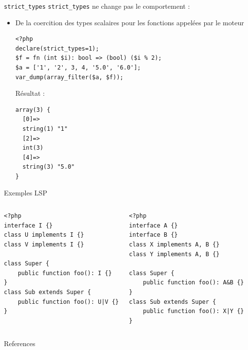 \documentclass[10pt]{beamer}
\begin{document}
\begin{frame}[fragile]{\texttt{strict\_types}}
    \texttt{strict\_types} ne change \alert{pas} le comportement :

    \begin{itemize}
        \item De la coercition des types scalaires pour les fonctions appelées par le moteur
            \begin{verbatim}
<?php
declare(strict_types=1);
$f = fn (int $i): bool => (bool) ($i % 2);
$a = ['1', '2', 3, 4, '5.0', '6.0'];
var_dump(array_filter($a, $f));
            \end{verbatim}
            Résultat :
            \begin{verbatim}
array(3) {
  [0]=>
  string(1) "1"
  [2]=>
  int(3)
  [4]=>
  string(3) "5.0"
}
            \end{verbatim}
    \end{itemize}
\end{frame}

\begin{frame}[fragile]{Exemples LSP}
    \begin{columns}[T,onlytextwidth]
    \begin{verbatim}
<?php
interface I {}
class U implements I {}
class V implements I {}

class Super {
    public function foo(): I {}
}
class Sub extends Super {
    public function foo(): U|V {}
}
    \end{verbatim}
    \begin{verbatim}
<?php
interface A {}
interface B {}
class X implements A, B {}
class Y implements A, B {}

class Super {
    public function foo(): A&B {}
}
class Sub extends Super {
    public function foo(): X|Y {}
}
    \end{verbatim}
    \end{columns}
\end{frame}

\begin{frame}[allowframebreaks]{References}

  \printbibliography

\end{frame}
\end{document}
